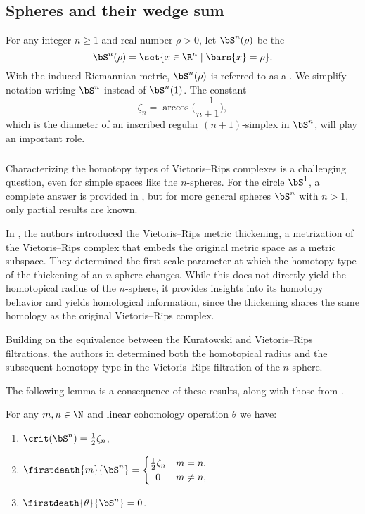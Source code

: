 
\subsection{Spheres and their wedge sum}\label{ss:Sn}

For any integer $n \geq 1$ and real number $\rho > 0$, let $\bS^n(\rho)$ be the 
\[
\bS^n(\rho) = \set{x \in \R^n \mid \bars{x} = \rho}.
\]
With the induced Riemannian metric, \(\bS^n(\rho)\) is referred to as a .
We simplify notation writing \(\bS^n\) instead of \(\bS^n(1)\).
The constant
\[
\zeta_n = \arccos\Big(\frac{-1}{n+1}\Big),
\]
which is the diameter of an inscribed regular $(n+1)$-simplex in $\bS^n$, will play an important role.

\subsubsection{}\label{ss:critical values of Sn}

Characterizing the homotopy types of Vietoris--Rips complexes is a challenging question, even for simple spaces like the $n$-spheres.
For the circle $\bS^1$, a complete answer is provided in \cite{adamaszek2017VietorisProduct}, but for more general spheres $\bS^n$ with $n>1$, only partial results are known.

In \cite{adamaszek2018metric}, the authors introduced the Vietoris--Rips metric thickening, a metrization of the Vietoris--Rips complex that embeds the original metric space as a metric subspace. They determined the first scale parameter at which the homotopy type of the thickening of an \(n\)-sphere changes.
While this does not directly yield the homotopical radius of the \(n\)-sphere, it provides insights into its homotopy behavior and yields homological information, since the thickening shares the same homology as the original Vietoris–Rips complex.

Building on the equivalence between the Kuratowski and Vietoris--Rips filtrations, the authors in \cite{lim2024vietoris} determined both the homotopical radius and the subsequent homotopy type in the Vietoris--Rips filtration of the \(n\)-sphere.

The following lemma is a consequence of these results, along with those from \cite{katz1983filling}.

\lemma
For any $m,n \in \N$ and linear cohomology operation $\theta$ we have:
\begin{enumerate}
	\item \(\crit(\bS^n) = \frac{1}{2}\zeta_n\),
	\item \(\firstdeath{m}{\bS^n} =
	\begin{cases}
		\frac{1}{2}\zeta_n & m = n, \\
		\hfil 0 & m \neq n,
	\end{cases}\)
	\item \(\firstdeath{\theta}{\bS^n} = 0\).
\end{enumerate}

